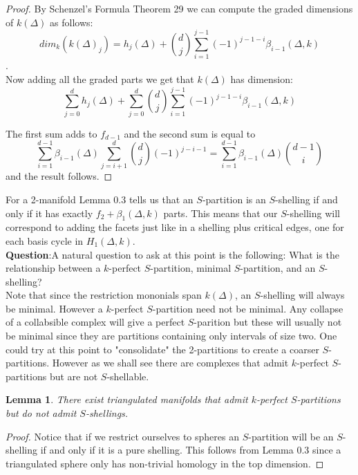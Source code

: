 \documentclass[a4paper]{article}
\newtheorem{lemma}[theorem]{Lemma}
\begin{document}
{\begin{proof}
By Schenzel's Formula \cite{facesurvey} Theorem 29 we can compute the graded dimensions of $k(\Delta)$ as follows: $$dim_k(k(\Delta)_j) = h_j(\Delta) + {d \choose j} \sum_{i = 1}^{j-1} (-1)^{j-1-i} \beta_{i-1}(\Delta, k)$$. \\

Now adding all the graded parts we get that $k(\Delta)$ has dimension: $$ \sum_{j=0}^d h_j(\Delta) +
\sum_{j=0}^d {d \choose j} \sum_{i = 1}^{j-1} (-1)^{j-1-i} \beta_{i-1}(\Delta, k)$$

The first sum adds to $f_{d-1}$ and the second sum is equal to $$\sum_{i = 1}^{d-1} \beta_{i-1} (\Delta) \sum_{j = i+1}^d {d \choose j} (-1)^{j-i-1} = \sum_{i=1}^{d-1} \beta_{i-1}(\Delta) {d-1 \choose i}$$ 
and the result follows.
\end{proof}

For a 2-manifold Lemma 0.3 tells us that an $S$-partition is an $S$-shelling if and only if it has exactly $f_2 + \beta_1(\Delta, k)$ parts. This means that our $S$-shelling will correspond to adding the facets just like in a shelling plus critical edges, one for each basis cycle in $H_1(\Delta, k)$. \\

\textbf{Question}:A natural question to ask at this point is the following: What is the relationship between a $k$-perfect $S$-partition, minimal $S$-partition, and an $S$-shelling? \\

Note that since the restriction mononials span $k(\Delta)$, an $S$-shelling will always be minimal. However a $k$-perfect $S$-partition need not be minimal. Any collapse of a collabsible complex will give a perfect $S$-parition but these will usually not be minimal since they are partitions containing only intervals of size two. One could try at this point to "consolidate" the 2-partitions to create a coarser $S$-partitions. However as we shall see there are complexes that admit $k$-perfect $S$-partitions but are not $S$-shellable. 


\begin{lemma}
There exist triangulated manifolds that admit $k$-perfect $S$-partitions but do not admit $S$-shellings.
\end{lemma}

\begin{proof}
Notice that if we restrict ourselves to spheres an $S$-partition will be an $S$-shelling if and only if it is a pure shelling. This follows from Lemma 0.3 since a triangulated sphere only has non-trivial homology in the top dimension. 


\end{proof}}
\end{document}

